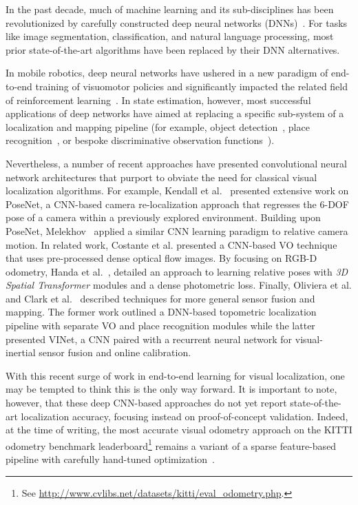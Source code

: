 In the past decade, much of machine learning and its sub-disciplines has been revolutionized by carefully constructed deep neural networks (DNNs)~\citep{LeCun2015-qf}. For tasks like image segmentation, classification, and natural language processing, most prior state-of-the-art algorithms have been replaced by their DNN alternatives.

In mobile robotics, deep neural networks have ushered in a new paradigm of end-to-end training of visuomotor policies \citep{Levine2016-bj} and significantly impacted the related field of reinforcement learning~\citep{Duan2016-jw}. In state estimation, however, most successful applications of deep networks have aimed at replacing a specific sub-system of a localization and mapping pipeline (for example, object detection~\citep{yang2016exploit}, place recognition~\citep{Sunderhauf2015-oc}, or bespoke discriminative observation functions~\citep{Haarnoja2016-ph}).

Nevertheless, a number of recent approaches have presented convolutional neural network architectures that purport to obviate the need for classical visual localization algorithms. For example, Kendall et al.~\citep{Kendall2015-ew, Kendall2017-ud} presented extensive work on PoseNet, a CNN-based camera re-localization approach that regresses the 6-DOF pose of a camera within a previously explored environment. Building upon PoseNet, Melekhov~\citep{Melekhov2017-dl} applied a similar CNN learning paradigm to relative camera motion. In related work, Costante et al. \citep{Costante2016-hb} presented a CNN-based VO technique that uses pre-processed dense optical flow images. By focusing on RGB-D odometry, Handa et al.~\cite{Handa2016-hm}, detailed an approach to learning relative poses with \textit{3D Spatial Transformer} modules and a dense photometric loss. Finally, Oliviera et al. \citep{Oliveira2017-lt} and Clark et al.~\citep{Clark2017} described techniques for more general sensor fusion and mapping. The former work outlined a DNN-based topometric localization pipeline with separate VO and place recognition modules while the latter presented VINet, a CNN paired with a recurrent neural network for visual-inertial sensor fusion and online calibration.

With this recent surge of work in end-to-end learning for visual localization, one may be tempted to think this is the only way forward. It is important to note, however, that these deep CNN-based approaches do not yet report state-of-the-art localization accuracy, focusing instead on proof-of-concept validation. Indeed, at the time of writing, the most accurate visual odometry approach on the KITTI odometry benchmark leaderboard\footnote{See \url{http://www.cvlibs.net/datasets/kitti/eval_odometry.php}.} remains a variant of a sparse feature-based pipeline with carefully hand-tuned optimization~\citep{Cvisic2015-mt}. 

